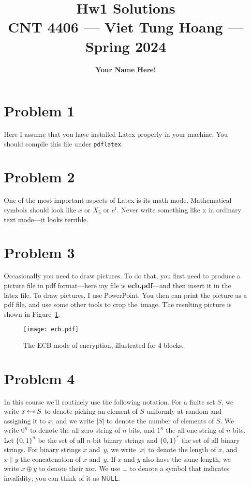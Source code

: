 \documentclass[11pt]{article}
\title{\bf Hw1 Solutions\\[2ex] 
       \rm\normalsize CNT 4406 --- Viet Tung Hoang --- Spring 2024}
\date{}
\author{\bf Your Name Here!}
\newcommand{\bits}{\{0, 1\}}
\newcommand{\getsr}{{\:{\leftarrow{\hspace*{-3pt}\raisebox{.75pt}{$\scriptscriptstyle\$$}}}\:}}
\newcommand{\concat}{\|}
\newcommand{\xor}{\oplus}
\newcommand{\NULL}{\mathsf{NULL}}
\newcommand{\figref}[1]{Figure~\ref{#1}}
\begin{document}
\maketitle


\section*{Problem 1} 

Here I assume that you have installed Latex properly in your machine. 
You should compile this file under \texttt{pdflatex}. 



\section*{Problem 2} 

One of the most important aspects of Latex is its math mode.
Mathematical symbols should look like $x$ or $X_5$ or $e^t$. 
Never write something like x in ordinary text mode---it looks terrible. 




\section*{Problem 3} 



Occasionally you need to draw pictures. 
To do that, you first need to produce a picture file in pdf format---here my file is \textbf{ecb.pdf}---and then insert it in the latex file. 
To draw pictures, I use PowerPoint. You then can print the picture as a pdf file, and use some other tools 
to crop the~image. 
The resulting picture is shown in \figref{fig:ecb}. 


\begin{figure}[ht]
	\centering
		\texttt{[image: ecb.pdf]}
	\caption{The ECB mode of encryption, illustrated for 4 blocks. }
	\label{fig:ecb}
\end{figure}


\section*{Problem 4} 

In this course we'll routinely use the following notation. 
For a finite set $S$, we write $x \getsr S$ to denote picking an element of $S$ uniformly at random and assigning it to $x$, 
and we write $|S|$ to denote the number of elements of $S$. 
We write $0^n$ to denote the all-zero string of $n$ bits, and $1^n$ the all-one string of $n$ bits. 
Let $\bits^n$ be the set of all $n$-bit binary strings and $\bits^*$ the set of all binary strings. 
For binary strings $x$ and~$y$, we write $|x|$ to denote the length of $x$, 
and $x \concat y$ the concatenation of $x$ and~$y$. 
If $x$ and $y$ also have the same length, we write $x \xor y$ to denote their xor. 
We use  $\bot$ to denote a symbol that indicates invalidity; you can think of it as $\NULL$. 
\end{document}
